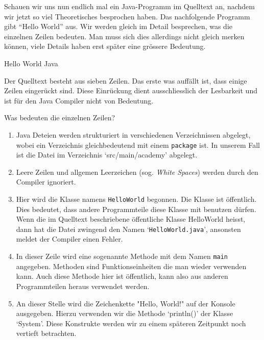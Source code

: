 Schauen wir uns nun endlich mal ein Java-Programm im Quelltext an, nachdem 
wir jetzt so viel Theoretisches besprochen haben. Das nachfolgende Programm 
gibt ``Hello World'' aus. Wir werden gleich im Detail besprechen, was die 
einzelnen Zeilen bedeuten. Man muss sich dies allerdings nicht gleich merken 
können, viele Details haben erst später eine grössere Bedeutung.


\mode*
\begin{listing}[h]
\caption{Hello World Java}
\label{lst:hello-world}
\end{listing}

Der Quelltext besteht aus sieben Zeilen. Das erste was auffällt ist, 
dass einige Zeilen eingerückt sind. Diese Einrückung dient ausschliesslich 
der Lesbarkeit und ist für den Java Compiler nicht von Bedeutung. 

Was bedeuten die einzelnen Zeilen?

\begin{enumerate}
	\item Java Deteien werden strukturiert in verschiedenen Verzeichnissen
	abgelegt, wobei ein Verzeichnis gleichbedeutend mit einem
	\texttt{package} ist. In unserem Fall ist die Datei im Verzeichnis 
	`src/main/academy' abgelegt.
	
	\item Leere Zeilen und allgemen Leerzeichen (sog. {\em White Spaces}) werden
	durch den Compiler ignoriert.

	\item Hier wird die Klasse namens \texttt{HelloWorld} begonnen. 
	Die Klasse ist öffentlich. Dies bedeutet, dass andere Programmteile diese 
	Klasse mit benutzen dürfen. Wenn die im Quelltext beschriebene öffentliche 
	Klasse HelloWorld heisst, dann hat die Datei zwingend den Namen 
	`{\tt HelloWorld.java}', ansonsten meldet der Compiler einen Fehler. 
	
	\item In dieser Zeile wird eine sogenannte Methode mit dem Namen 
	\texttt{main} angegeben. Methoden sind Funktionseinheiten die 
	man wieder verwenden kann. Auch diese Methode hier ist öffentlich, kann 
	also aus anderen Programmteilen heraus verwendet werden. 
	
	\item An dieser Stelle wird die Zeichenkette "Hello, World!" auf der Konsole 
	ausgegeben. Hierzu verwenden wir die Methode `println()' der Klasse `System'.
	Diese Konstrukte werden wir zu einem späteren Zeitpunkt noch vertieft 
	betrachten.
\end{enumerate}



